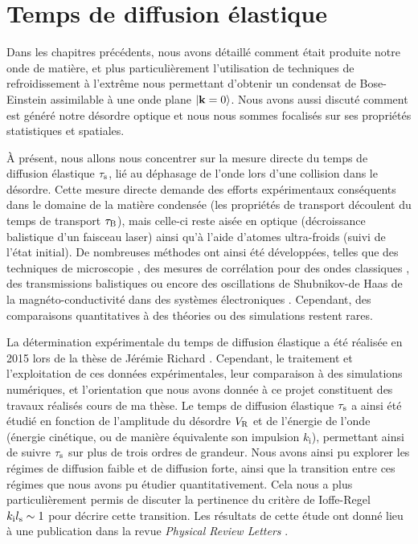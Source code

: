 \chapter{Temps de diffusion élastique}
\label{ch:TauS_PRL}

Dans les chapitres précédents, nous avons détaillé comment était produite notre onde de matière, et plus particulièrement l'utilisation de techniques de refroidissement à l'extrême nous permettant d'obtenir un condensat de Bose-Einstein assimilable à une onde plane $\left| \mathbf{k}=0 \right\rangle$. Nous avons aussi discuté comment est généré notre désordre optique et nous nous sommes focalisés sur ses propriétés statistiques et spatiales.

À présent, nous allons nous concentrer sur la mesure directe du temps de diffusion élastique $\tau_{\mathrm{s}}$, lié au déphasage de l'onde lors d'une collision dans le désordre. Cette mesure directe demande des efforts expérimentaux conséquents dans le domaine de la matière condensée (les propriétés de transport découlent du temps de transport $\tau_{\mathrm{B}}$), mais celle-ci reste aisée en optique (décroissance balistique d'un faisceau laser) ainsi qu'à l'aide d'atomes ultra-froids (suivi de l'état initial). De nombreuses méthodes ont ainsi été développées, telles que des techniques de microscopie \citep{jacques2012reflectance}\citep{martin2016determination}, des mesures de corrélation pour des ondes classiques \citep{sebbah2002spatial}\citep{hildebrand2014observation}\citep{obermann2014measuring}, des transmissions balistiques \citep{page1996group}\citep{savo2017observation} ou encore des oscillations de Shubnikov-de Haas de la magnéto-conductivité dans des systèmes électroniques \citep{niederer1974magneto}\citep{bockelmann1990single}\citep{monteverde2010transport}. Cependant, des comparaisons quantitatives à des théories ou des simulations restent rares.




La détermination expérimentale du temps de diffusion élastique a été réalisée en 2015 lors de la thèse de Jérémie Richard \citep{richard2015propagation}. Cependant, le traitement et l'exploitation de ces données expérimentales, leur comparaison à des simulations numériques, et l'orientation que nous avons donnée à ce projet constituent des travaux réalisés cours de ma thèse. Le temps de diffusion élastique $\tau_{\mathrm{s}}$ a ainsi été étudié en fonction de l'amplitude du désordre $V_{\mathrm{R}}$ et de l'énergie de l'onde (énergie cinétique, ou de manière équivalente son impulsion $k_{\mathrm{i}}$), permettant ainsi de suivre $\tau_{\mathrm{s}}$ sur plus de trois ordres de grandeur. Nous avons ainsi pu explorer les régimes de diffusion faible et de diffusion forte, ainsi que la transition entre ces régimes que nous avons pu étudier quantitativement. Cela nous a plus particulièrement permis de discuter la pertinence du critère de Ioffe-Regel $k_{\mathrm{i}}l_{\mathrm{s}}\sim 1 $ pour décrire cette transition. Les résultats de cette étude ont donné lieu à une publication dans la revue \emph{Physical Review Letters} \citep{richard2019elastic}.



